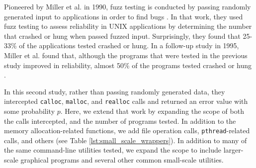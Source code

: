 Pioneered by Miller et al. in 1990, fuzz testing is conducted by passing randomly generated input to applications in order to find bugs \cite{bartoriginal}. In that work, they used fuzz testing to assess reliability in UNIX applications by determining the number that crashed or hung when passed fuzzed input. Surprisingly, they found that 25-33\% of the applications tested crashed or hung. In a follow-up study in 1995, Miller et al. found that, although the programs that were tested in the previous study improved in reliability, almost 50\% of the programs tested crashed or hung \cite{bart}.

In this second study, rather than passing randomly generated data, they intercepted \texttt{calloc}, \texttt{malloc}, and \texttt{realloc} calls and returned an error value with some probability $p$. Here, we extend that work by expanding the scope of both the calls intercepted, and the number of programs tested. In addition to the memory allocation-related functions, we add file operation calls, \texttt{pthread}-related calls, and others (see Table \ref{lst:small_scale_wrappers}). In addition to many of the same command-line utilities tested, we expand the scope to include larger-scale graphical programs and several other common small-scale utilities.